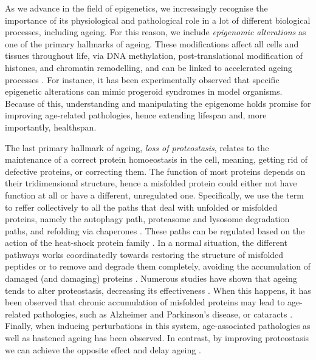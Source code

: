 As we advance in the field of epigenetics, we increasingly recognise the importance of its physiological and pathological role in a lot of different biological processes, including ageing.
For this reason, we include \emph{epigenomic alterations} as one of the primary hallmarks of ageing.
These modifications affect all cells and tissues throughout life, via DNA methylation, post-translational modification of histones, and chromatin remodelling, and can be linked to accelerated ageing processes \cite{Pal2016}.
For instance, it has been experimentally observed that specific epigenetic alterations can mimic progeroid syndromes in model organisms\cite{Osorio2010}.
Because of this, understanding and manipulating the epigenome holds promise for improving age-related pathologies, hence extending lifespan and, more importantly, healthspan.

The last primary hallmark of ageing, \emph{loss of proteostasis}, relates to the maintenance of a correct protein homoeostasis in the cell, meaning, getting rid of defective proteins, or correcting them.
The function of most proteins depends on their tridimensional structure, hence a misfolded protein could either not have function at all or have a different, unregulated one.
Specifically, we use the term  to reffer collectively to all the paths that deal with unfolded or misfolded proteins, namely the autophagy path, proteasome and lysosome degradation paths, and refolding via chaperones \cite{Klaips2018}.
These paths can be regulated based on the action of the heat-shock protein family \cite{Hartl2011,Koga2011,Mizushima2008}.
In a normal situation, the different pathways works coordinatedly towards restoring the structure of misfolded peptides or to remove and degrade them completely, avoiding the accumulation of damaged (and damaging) proteins \cite{Powers2009}.
Numerous studies have shown that ageing tends to alter proteostasis, decreasing its effectiveness \cite{Hipp2019}.
When this happens, it has been observed that chronic accumulation of misfolded proteins may lead to age-related pathologies, such as Alzheimer and Parkinson's disease, or cataracts \cite{Powers2009}.
Finally, when inducing perturbations in this system, age-associated pathologies as well as hastened ageing has been observed.
In contrast, by improving proteostasis we can achieve the opposite effect and delay ageing \cite{Zhang2008}.

